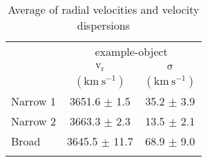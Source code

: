 \documentclass{article}
\begin{document}
\begin{longtable}{lcc}
\hline
 & \multicolumn{2}{c}{example-object} \\ 
 & $\mathrm{v_r}$ & $\mathrm{\sigma}$ \\ 
\scriptsize  & \scriptsize $\mathrm{(km \ s^{-1})}$ & \scriptsize $\mathrm{(km \ s^{-1})}$ \\ 
\hline
Narrow 1 & 3651.6 $\pm$ 1.5 & 35.2 $\pm$ 3.9 \\ 
Narrow 2 & 3663.3 $\pm$ 2.3 & 13.5 $\pm$ 2.1 \\ 
Broad & 3645.5 $\pm$ 11.7 & 68.9 $\pm$ 9.0 \\ 
\hline
\caption{Average of radial velocities and velocity dispersions}
\end{longtable}
\end{document}
